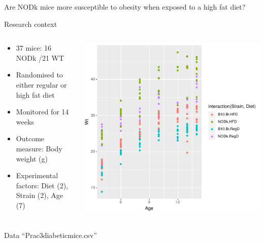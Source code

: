 \documentclass[10pt]{beamer}
\begin{document}
\begin{frame}{Are NODk mice more susceptible to obesity when exposed to a high fat diet?}
  
  \begin{block}{Research context}
 \begin{columns}
  \begin{column}{0.5\textwidth}
   \begin{itemize}
    \item 37 mice: 16 NODk /21 WT
    \item Randomised to either regular or high fat diet
    \item Monitored for 14 weeks
    \item Outcome measure: Body weight (g)
    \item Experimental factors: Diet (2), Strain (2), Age (7)
   \end{itemize}
  \end{column}
  \begin{column}{0.5\textwidth}
    \includegraphics[width=\textwidth]{Figures/micedata}
  \end{column}

 \end{columns}
 \end{block}
 
 Data ``Prac3diabeticmice.csv''
 
\end{frame}
\end{document}
